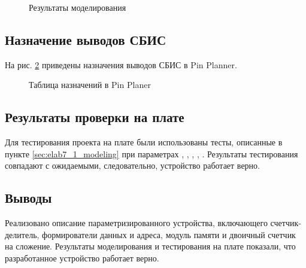 \begin{figure}[H]
\begin{center}
	\caption{Результаты моделирования}
	\label{fig:elab7_1_modeling}
\end{center}
\end{figure}

\subsection{Назначение выводов СБИС}

На рис. \ref{fig:elab7_1_pins} приведены назначения выводов СБИС в Pin Planner.

\begin{figure}[H]
\begin{center}
	\caption{Таблица назначений в Pin Planer}
	\label{fig:elab7_1_pins}
\end{center}
\end{figure}

\subsection{Результаты проверки на плате}

Для тестирования проекта на плате были использованы тесты, описанные в пункте \ref{sec:elab7_1_modeling} при параметрах , , , , . Результаты тестирования совпадают с ожидаемыми, следовательно, устройство работает верно.

\subsection{Выводы}

Реализовано описание параметризированного устройства, включающего счетчик-делитель, формирователи данных и адреса, модуль памяти и двоичный счетчик на сложение. Результаты моделирования и тестирования на плате показали, что разработанное устройство работает верно.

